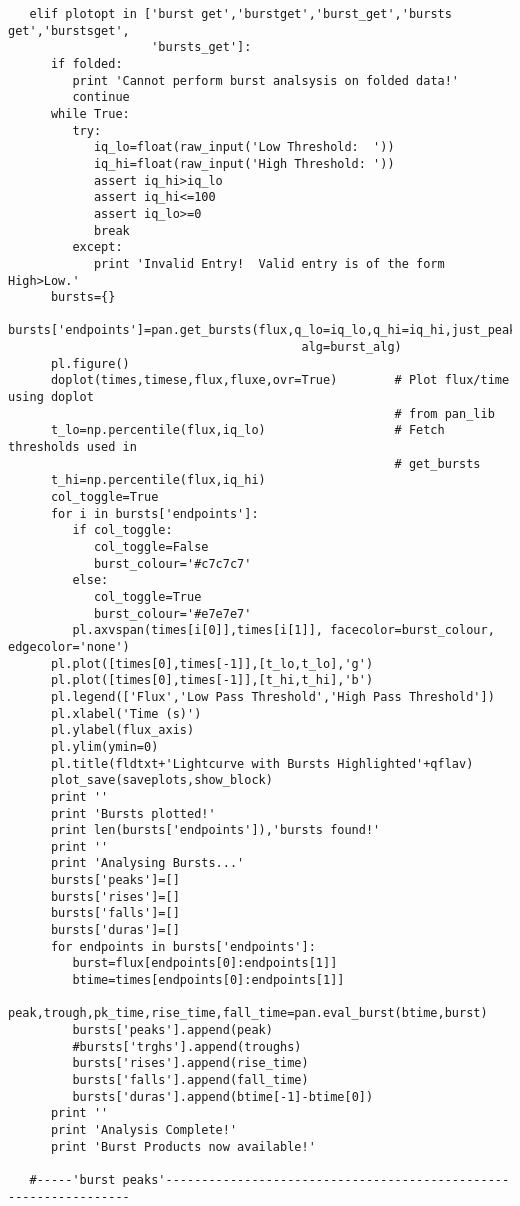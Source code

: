 \begin{verbatim}
   elif plotopt in ['burst get','burstget','burst_get','bursts get','burstsget',
                    'bursts_get']:
      if folded:
         print 'Cannot perform burst analsysis on folded data!'
         continue
      while True:
         try:
            iq_lo=float(raw_input('Low Threshold:  '))
            iq_hi=float(raw_input('High Threshold: '))
            assert iq_hi>iq_lo
            assert iq_hi<=100
            assert iq_lo>=0
            break
         except:
            print 'Invalid Entry!  Valid entry is of the form High>Low.'
      bursts={}
      bursts['endpoints']=pan.get_bursts(flux,q_lo=iq_lo,q_hi=iq_hi,just_peaks=False,
                                         alg=burst_alg)
      pl.figure()
      doplot(times,timese,flux,fluxe,ovr=True)        # Plot flux/time using doplot
                                                      # from pan_lib
      t_lo=np.percentile(flux,iq_lo)                  # Fetch thresholds used in
                                                      # get_bursts
      t_hi=np.percentile(flux,iq_hi)
      col_toggle=True
      for i in bursts['endpoints']:
         if col_toggle:
            col_toggle=False
            burst_colour='#c7c7c7'
         else:
            col_toggle=True
            burst_colour='#e7e7e7'
         pl.axvspan(times[i[0]],times[i[1]], facecolor=burst_colour, edgecolor='none')
      pl.plot([times[0],times[-1]],[t_lo,t_lo],'g')
      pl.plot([times[0],times[-1]],[t_hi,t_hi],'b')
      pl.legend(['Flux','Low Pass Threshold','High Pass Threshold'])
      pl.xlabel('Time (s)')
      pl.ylabel(flux_axis)
      pl.ylim(ymin=0)
      pl.title(fldtxt+'Lightcurve with Bursts Highlighted'+qflav)
      plot_save(saveplots,show_block)
      print ''
      print 'Bursts plotted!'
      print len(bursts['endpoints']),'bursts found!'
      print ''
      print 'Analysing Bursts...'
      bursts['peaks']=[]
      bursts['rises']=[]
      bursts['falls']=[]
      bursts['duras']=[]
      for endpoints in bursts['endpoints']:
         burst=flux[endpoints[0]:endpoints[1]]
         btime=times[endpoints[0]:endpoints[1]]
         peak,trough,pk_time,rise_time,fall_time=pan.eval_burst(btime,burst)
         bursts['peaks'].append(peak)
         #bursts['trghs'].append(troughs)
         bursts['rises'].append(rise_time)
         bursts['falls'].append(fall_time)
         bursts['duras'].append(btime[-1]-btime[0])
      print ''
      print 'Analysis Complete!'
      print 'Burst Products now available!'

   #-----'burst peaks'-----------------------------------------------------------------


\end{verbatim}
